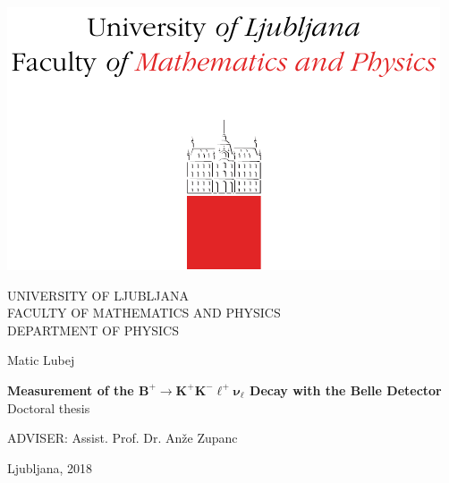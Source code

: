 \documentclass[longbibliography,a4paper,12pt]{book}
\begin{document}
\pagestyle{empty}
\begin{center}
	
\includegraphics[trim={0 0 0 2cm},clip]{logo}

{\large UNIVERSITY OF LJUBLJANA\\
FACULTY OF MATHEMATICS AND PHYSICS\\
DEPARTMENT OF PHYSICS\\}

\vspace{5cm}

{\Large Matic Lubej\\}

\vspace{10mm}

{\bf \Large Measurement of the $\bm{B^+ \to K^+K^-\ell^+\nu_\ell}$ Decay with the Belle Detector\\}
\vspace{5mm}
{\large Doctoral thesis}\\

\vfill

{\large ADVISER: Assist. Prof. Dr. An\v ze Zupanc\\
}

\vspace{2cm}
{\large Ljubljana, 2018}

\end{center}

\end{document}

